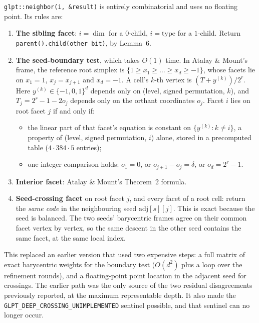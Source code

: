 \documentclass[11pt]{article}
\newcommand{\type}{\mathrm{type}}
\begin{document}
\texttt{glpt::neighbor(i,\,\&result)} is entirely combinatorial and uses
no floating point. Its rules are:
\begin{enumerate}
\item \textbf{The sibling facet}: $i=\dim$ for a $0$-child, $i=\type$
  for a $1$-child. Return \texttt{parent().child(other bit)}, by Lemma~6.
\item \textbf{The seed-boundary test}, which takes $O(1)$ time. In
  Atalay \& Mount's frame, the reference root simplex is
  $\{1\ge x_1\ge\dots\ge x_d\ge-1\}$, whose facets lie on $x_1=1$,
  $x_j=x_{j+1}$ and $x_d=-1$. A cell's $k$-th vertex is $(T+y^{(k)})/2^r$.
  Here $y^{(k)}\in\{-1,0,1\}^d$ depends only on (level, signed
  permutation, $k$), and $T_j=2^r-1-2o_j$ depends only on the orthant
  coordinates $o_j$. Facet $i$ lies on root facet $j$ if and only if:
  \begin{itemize}
  \item the linear part of that facet's equation is constant on
    $\{y^{(k)}:k\ne i\}$, a property of (level, signed permutation, $i$)
    alone, stored in a precomputed table ($4\cdot384\cdot5$ entries);
  \item one integer comparison holds: $o_1=0$, or $o_{j+1}-o_j=\delta$,
    or $o_d=2^r-1$.
  \end{itemize}
\item \textbf{Interior facet}: Atalay \& Mount's Theorem~2 formula.
\item \textbf{Seed-crossing facet} on root facet $j$, and every facet of
  a root cell: return the \emph{same code} in the neighbouring seed
  $\mathrm{adj}[s][j]$. This is exact because the seed is balanced. The
  two seeds' barycentric frames agree on their common facet vertex by
  vertex, so the same descent in the other seed contains the same facet,
  at the same local index.
\end{enumerate}
This replaced an earlier version that used two expensive steps: a full
matrix of exact barycentric weights for the boundary test ($O(d^2)$ plus
a loop over the refinement rounds), and a floating-point point location
in the adjacent seed for crossings. The earlier path was the only
source of the two residual disagreements previously reported, at the
maximum representable depth. It also made the
\texttt{GLPT\_DEEP\_CROSSING\_UNIMPLEMENTED} sentinel possible, and that
sentinel can no longer occur.
\end{document}

